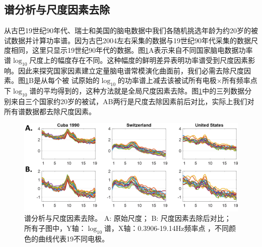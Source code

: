 \subsection{谱分析与尺度因素去除}
从古巴19世纪90年代、瑞士和美国的脑电数据中我们各随机挑选年龄为约20岁的被试数据并计算功率谱。因为古巴2004左右采集的数据与19世纪90年代采集的数据尺度相同，这里只显示19世纪90年代的数据。图\ref{gsf}A表示来自不同国家脑电数据功率谱$\log_{10}$尺度上的幅度存在不同。这种幅度的鲜明差异表明功率谱受到尺度因素影响。因此来探究国家因素建立定量脑电谱常模演化曲面前，我们必需去除尺度因素。图\ref{gsf}B是从每个被
试原始的$\log_{10}$的功率谱上减去该被试所有电极$\times$所有频率点下$\log_{10}$谱的平均得到的，这种方法就是全局尺度因素去除。图\ref{gsf}中的三列数据分别来自三个国家约20岁的被试，AB两行是尺度去除因素前后对比，实际上我们对所有谱数据都去除尺度因素。
\begin{figure}[!ht]
\includegraphics[width=15cm]{pic/Norm/figure4.png}
\caption{谱分析与尺度因素去除。 A: 原始尺度； B: 尺度因素去除后对比； 所有子图中，Y轴：$\log_{10}$谱，X轴：0.3906-19.14Hz频率点
，不同颜色的曲线代表19不同电极。}
\label{gsf}
\end{figure}

